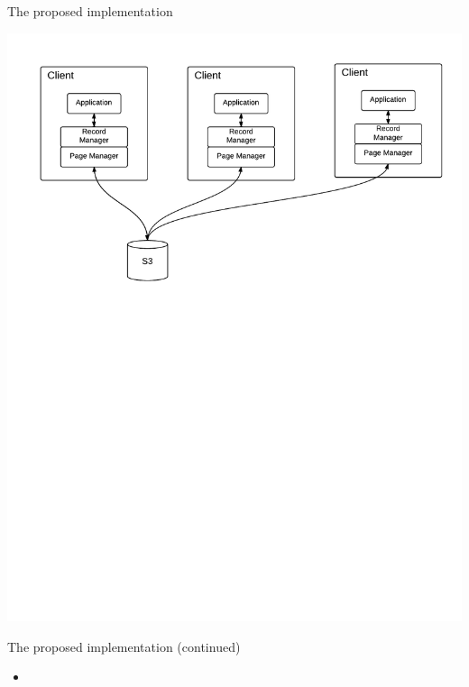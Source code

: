 \documentclass{beamer}
\begin{document}
  \begin{frame}{The proposed implementation}
    \begin{center}
      \includegraphics[width=\linewidth]{img/ADB arch 3.pdf}
    \end{center}
  \end{frame}

  \begin{frame}{The proposed implementation (continued)}
    \begin{itemize}
    \item

    \end{itemize}
  \end{frame}
\end{document}

